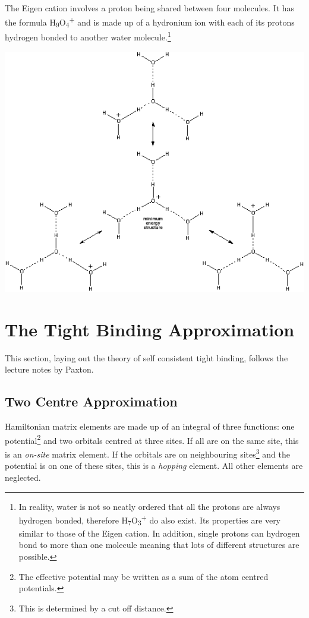 \documentclass{article}
\newenvironment{Figure}{\par\medskip\noindent\minipage{\linewidth}}{\endminipage\par\medskip}
\begin{document}
\begin{multicols}{2}
The Eigen cation involves a proton being shared between four molecules. It has the formula H\textsubscript{9}O\textsubscript{4}\textsuperscript{+} and is made up of a hydronium ion with each of its protons hydrogen bonded to another water molecule.\footnote{In reality, water is not so neatly ordered that all the protons are always hydrogen bonded, therefore H\textsubscript{7}O\textsubscript{3}\textsuperscript{+} do also exist. Its properties are very similar to those of the Eigen cation. In addition, single protons can hydrogen bond to more than one molecule meaning that lots of different structures are possible.}
\begin{Figure}
	\includegraphics[width=\textwidth]{figures/Eigen}
	\label{fig:Eigen}	
\end{Figure}

\section{The Tight Binding Approximation}
This section, laying out the theory of self consistent tight binding, follows the lecture notes by Paxton.\cite{Paxton2009} 

\subsection{Two Centre Approximation}
Hamiltonian matrix elements are made up of an integral of three functions: one potential\footnote{The effective potential may be written as a sum of the atom centred potentials.} and two orbitals centred at three sites. If all are on the same site, this is an \textit{on-site} matrix element. If the orbitals are on neighbouring sites\footnote{This is determined by a cut off distance.} and the potential is on one of these sites, this is a \textit{hopping} element. All other elements are neglected.


\end{multicols}
\end{document}
